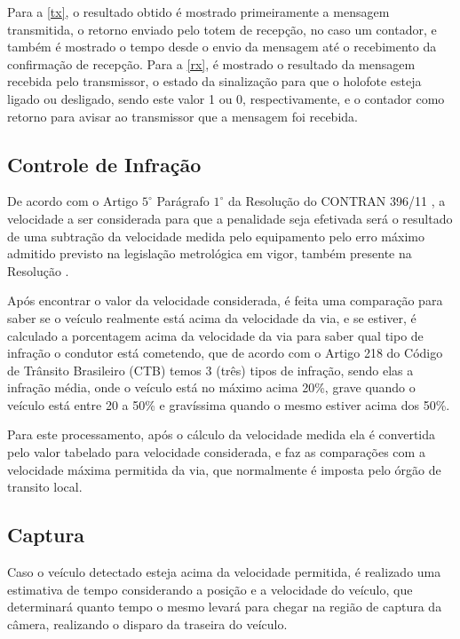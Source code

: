 Para a \ref{tx}, o resultado obtido é mostrado primeiramente a mensagem transmitida, o retorno enviado pelo totem de recepção, no caso um contador, e também é mostrado o tempo desde o envio da mensagem até o recebimento da confirmação de recepção. Para a \ref{rx}, é mostrado o resultado da mensagem recebida pelo transmissor, o estado da sinalização para que o holofote esteja ligado ou desligado, sendo este valor 1 ou 0, respectivamente, e o contador como retorno para avisar ao transmissor que a mensagem foi recebida.
 
  \subsection{Controle de Infração}
  
De acordo com o Artigo $5^{\circ}$ Parágrafo $1^{\circ}$ da Resolução do CONTRAN 396/11 \cite{CONTRAN}, a velocidade a ser considerada para que a penalidade seja efetivada será o resultado de uma subtração da velocidade medida pelo equipamento pelo erro máximo admitido previsto na legislação metrológica em vigor, também presente na Resolução \cite{CONTRAN}.
   
 Após encontrar o valor da velocidade considerada, é feita uma comparação para saber se o veículo realmente está acima da velocidade da via, e se estiver, é calculado a porcentagem acima da velocidade da via para saber qual tipo de infração o condutor está cometendo, que de acordo com o Artigo 218 do Código de Trânsito Brasileiro (CTB) \cite{CTB} temos 3 (três) tipos de infração, sendo elas a infração média, onde o veículo está no máximo acima 20\%, grave quando o veículo está entre 20 a 50\% e gravíssima quando o mesmo estiver acima dos 50\%.   
    
Para este processamento, após o cálculo da velocidade medida ela é convertida pelo valor tabelado para velocidade considerada, e faz as comparações com a velocidade máxima permitida da via, que normalmente é imposta pelo órgão de transito local.    

\subsection{Captura}
    
Caso o veículo detectado esteja acima da velocidade permitida, é realizado uma estimativa de tempo considerando a posição e a velocidade do veículo, que determinará quanto tempo o mesmo levará para chegar na região de captura da câmera, realizando o disparo da traseira do veículo.
    
